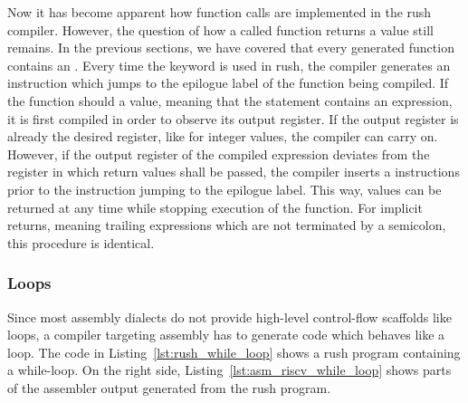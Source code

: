 Now it has become apparent how function calls are implemented in the rush \riscv{} compiler.
However, the question of how a called function returns a value still remains.
In the previous sections, we have covered that every generated function contains an .
Every time the  keyword is used in rush, the compiler generates an instruction which jumps to the epilogue label of the function being compiled.
If the function should a value, meaning that the  statement contains an expression,
it is first compiled in order to observe its output register.
If the output register is already the desired register, like  for integer values, the compiler can carry on.
However, if the output register of the compiled expression deviates from the register in which return values shall be passed,
the compiler inserts a  instructions prior to the instruction jumping to the epilogue label.
This way, values can be returned at any time while stopping execution of the function.
For implicit returns, meaning trailing expressions which are not terminated by a semicolon,
this procedure is identical.

\subsubsection{Loops}

Since most assembly dialects do not provide high-level control-flow scaffolds like loops,
a compiler targeting assembly has to generate code which behaves like a loop.
The code in Listing~\ref{lst:rush_while_loop} shows a rush program containing a while-loop.
On the right side, Listing~\ref{lst:asm_riscv_while_loop} shows parts of the assembler output generated from the rush program.

\begin{minipage}{.32\textwidth}
	\center
\end{minipage}%
\hspace{2.5cm}
\begin{minipage}{.47\textwidth}
	\center
\end{minipage}

